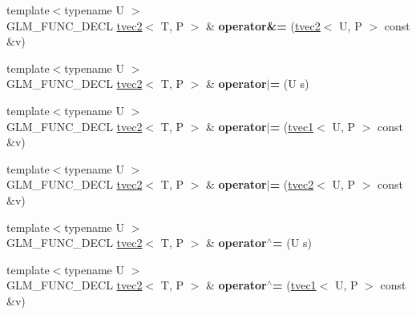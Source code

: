 \begin{DoxyCompactItemize}
\item 
\hypertarget{structglm_1_1tvec2_a672a9a33f367f753d0fc12116bff65bf}{{\footnotesize template$<$typename U $>$ }\\G\-L\-M\-\_\-\-F\-U\-N\-C\-\_\-\-D\-E\-C\-L \hyperlink{structglm_1_1tvec2}{tvec2}$<$ T, P $>$ \& {\bfseries operator\&=} (\hyperlink{structglm_1_1tvec2}{tvec2}$<$ U, P $>$ const \&v)}\label{structglm_1_1tvec2_a672a9a33f367f753d0fc12116bff65bf}

\item 
\hypertarget{structglm_1_1tvec2_a1cea2997d322208a92ce89a91d313a6a}{{\footnotesize template$<$typename U $>$ }\\G\-L\-M\-\_\-\-F\-U\-N\-C\-\_\-\-D\-E\-C\-L \hyperlink{structglm_1_1tvec2}{tvec2}$<$ T, P $>$ \& {\bfseries operator$\vert$=} (U s)}\label{structglm_1_1tvec2_a1cea2997d322208a92ce89a91d313a6a}

\item 
\hypertarget{structglm_1_1tvec2_a4cb8e942400c0ea18beb292a50c49958}{{\footnotesize template$<$typename U $>$ }\\G\-L\-M\-\_\-\-F\-U\-N\-C\-\_\-\-D\-E\-C\-L \hyperlink{structglm_1_1tvec2}{tvec2}$<$ T, P $>$ \& {\bfseries operator$\vert$=} (\hyperlink{structglm_1_1tvec1}{tvec1}$<$ U, P $>$ const \&v)}\label{structglm_1_1tvec2_a4cb8e942400c0ea18beb292a50c49958}

\item 
\hypertarget{structglm_1_1tvec2_a2bb8b0876df3f551acf4dae3134e0d2e}{{\footnotesize template$<$typename U $>$ }\\G\-L\-M\-\_\-\-F\-U\-N\-C\-\_\-\-D\-E\-C\-L \hyperlink{structglm_1_1tvec2}{tvec2}$<$ T, P $>$ \& {\bfseries operator$\vert$=} (\hyperlink{structglm_1_1tvec2}{tvec2}$<$ U, P $>$ const \&v)}\label{structglm_1_1tvec2_a2bb8b0876df3f551acf4dae3134e0d2e}

\item 
\hypertarget{structglm_1_1tvec2_a35a65b1287ee0ef3d77813e85bda9b79}{{\footnotesize template$<$typename U $>$ }\\G\-L\-M\-\_\-\-F\-U\-N\-C\-\_\-\-D\-E\-C\-L \hyperlink{structglm_1_1tvec2}{tvec2}$<$ T, P $>$ \& {\bfseries operator$^\wedge$=} (U s)}\label{structglm_1_1tvec2_a35a65b1287ee0ef3d77813e85bda9b79}

\item 
\hypertarget{structglm_1_1tvec2_a50b26c0a009d0ed134ae0984da6d50ab}{{\footnotesize template$<$typename U $>$ }\\G\-L\-M\-\_\-\-F\-U\-N\-C\-\_\-\-D\-E\-C\-L \hyperlink{structglm_1_1tvec2}{tvec2}$<$ T, P $>$ \& {\bfseries operator$^\wedge$=} (\hyperlink{structglm_1_1tvec1}{tvec1}$<$ U, P $>$ const \&v)}\label{structglm_1_1tvec2_a50b26c0a009d0ed134ae0984da6d50ab}


\end{DoxyCompactItemize}
